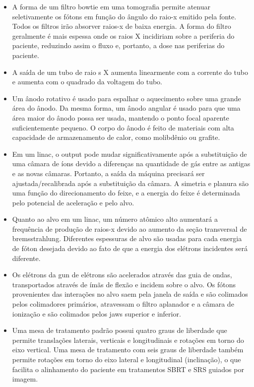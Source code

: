\documentclass[11pt,a4paper]{article}
\newcounter{exemplo}
\begin{document}
\begin{exemplo}[Física]
\begin{itemize}
        \item A forma de um filtro bowtie em uma tomografia permite atenuar seletivamente os fótons em função do ângulo do raio-x emitido pela fonte. Todos os filtros irão absorver raios-x de baixa energia. A forma do filtro geralmente é mais espessa onde os raios X incidiriam sobre a periferia do paciente, reduzindo assim o fluxo e, portanto, a dose nas periferias do paciente.
        
        \item A saída de um tubo de raio    s X aumenta linearmente com a corrente do tubo e aumenta com o quadrado da voltagem do tubo.
        
        \item Um ânodo rotativo é usado para espalhar o aquecimento sobre uma grande área do ânodo. Da mesma forma, um ânodo angular é usado para que uma área maior do ânodo possa ser usada, mantendo o ponto focal aparente suficientemente pequeno. O corpo do ânodo é feito de materiais com alta capacidade de armazenamento de calor, como molibdênio ou grafite.
        
        \item Em um linac, o output pode mudar significativamente após a substituição de uma câmara de íons devido a diferenças na quantidade de gás entre as antigas e as novas câmaras. Portanto, a saída da máquina precisará ser ajustada/recalibrada após a substituição da câmara. A simetria e planura são uma função do direcionamento do feixe, e a energia do feixe é determinada pelo potencial de aceleração e pelo alvo.
        
        \item Quanto ao alvo em um linac, um número atômico alto aumentará a frequência de produção de raios-x devido ao aumento da seção transversal de bremsstrahlung. Diferentes espessuras de alvo são usadas para cada energia de fóton desejada devido ao fato de que a energia dos elétrons incidentes será diferente.
        
        \item Os elétrons da gun de elétrons são acelerados através das guia de ondas, transportados através de ímãs de flexão e incidem sobre o alvo. Os fótons provenientes das interações no alvo saem pela janela de saída e são colimados pelos colimadores primários, atravessam o filtro aplanador e a câmara de ionização e são colimados pelos jaws superior e inferior.
        
        \item Uma mesa de tratamento padrão possui quatro graus de liberdade que permite translações laterais, verticais e longitudinais e rotações em torno do eixo vertical. Uma mesa de tratamento com seis graus de liberdade também permite rotações em torno do eixo lateral e longitudinal (inclinação), o que facilita o alinhamento do paciente em tratamentos SBRT e SRS guiados por imagem.
        

\end{itemize}
\end{exemplo}
\end{document}
